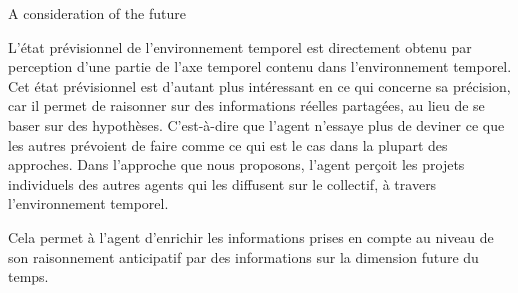 \begin{frame}{A consideration of the future}
{\par L'état prévisionnel de l'environnement temporel est directement obtenu par perception d'une partie de l'axe temporel contenu dans l'environnement temporel. Cet état prévisionnel est d'autant plus intéressant en ce qui concerne sa précision, car il permet de raisonner sur des informations réelles partagées, au lieu de se baser sur des hypothèses. C'est-à-dire que l'agent n'essaye plus de deviner ce que les autres prévoient de faire comme ce qui est le cas dans la plupart des approches. Dans l'approche que nous proposons, l'agent perçoit les projets individuels des autres agents qui les diffusent sur le collectif, à travers l'environnement temporel.
\par Cela permet à l'agent d'enrichir les informations prises en compte au niveau de son raisonnement anticipatif par des informations sur la dimension future du temps.
}
    
\end{frame}

